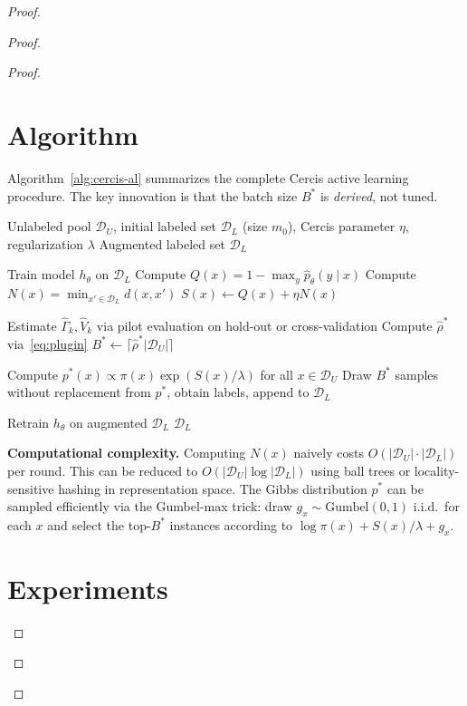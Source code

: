\documentclass[12pt,a4paper]{article}
\newcommand{\cD}{\mathcal{D}}
\begin{document}
\begin{proof}
\begin{proof}
\begin{proof}
\section{Algorithm}

Algorithm~\ref{alg:cercis-al} summarizes the complete Cercis active learning
procedure.  The key innovation is that the batch size $B^*$ is
\emph{derived}, not tuned.

\begin{algorithm}[tb]
\caption{Cercis Optimal Active Learning (COAL)}
\label{alg:cercis-al}
\begin{algorithmic}[1]
\Require Unlabeled pool $\cD_U$, initial labeled set $\cD_L$ (size $m_0$),
         Cercis parameter $\eta$, regularization $\lambda$
\Ensure Augmented labeled set $\cD_L$

\State Train model $h_\theta$ on $\cD_L$
\For{$x\in\cD_U$}
    \State Compute $Q(x)=1-\max_y\hat{p}_\theta(y\mid x)$
    \State Compute $N(x)=\min_{x'\in\cD_L} d(x,x')$
    \State $S(x)\gets Q(x)+\eta N(x)$
\EndFor

\State Estimate $\widehat{\Gamma}_k,\widehat{V}_k$ via pilot evaluation
       on hold-out or cross-validation
\State Compute $\hat{\rho}^*$ via~\eqref{eq:plugin}
\State $B^* \gets \lceil\hat{\rho}^*|\cD_U|\rceil$

\State Compute $p^*(x)\propto\pi(x)\exp(S(x)/\lambda)$ for all $x\in\cD_U$
\State Draw $B^*$ samples without replacement from $p^*$, obtain labels,
       append to $\cD_L$

\State Retrain $h_\theta$ on augmented $\cD_L$
\State \Return $\cD_L$
\end{algorithmic}
\end{algorithm}

\medskip\noindent
\textbf{Computational complexity.}
Computing $N(x)$ naively costs $O(|\cD_U|\cdot|\cD_L|)$ per round.
This can be reduced to $O(|\cD_U|\log|\cD_L|)$ using ball trees or
locality-sensitive hashing in representation space.
The Gibbs distribution $p^*$ can be sampled efficiently via
the Gumbel-max trick: draw $g_x\sim\text{Gumbel}(0,1)$ i.i.d.\ for each
$x$ and select the top-$B^*$ instances according to
$\log\pi(x)+S(x)/\lambda+g_x$.

\section{Experiments}


\end{proof}
\end{proof}
\end{proof}
\end{document}
